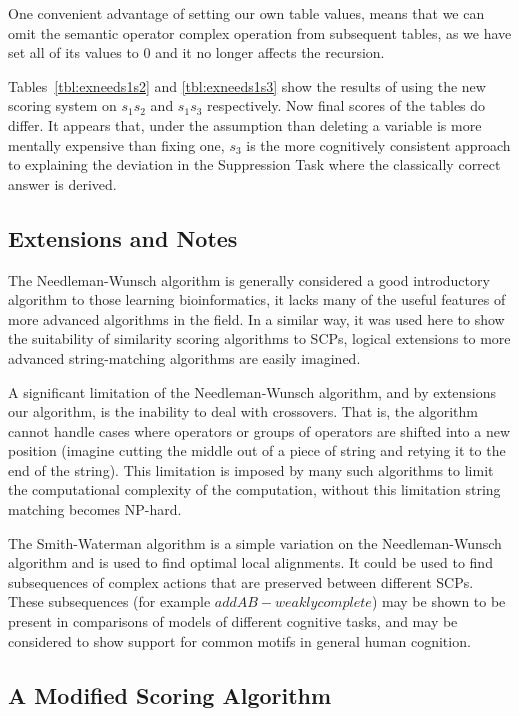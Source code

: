 One convenient advantage of setting our own table values, means that we can omit the semantic operator complex operation from subsequent tables, as we have set all of its values to 0 and it no longer affects the recursion.

Tables~\ref{tbl:exneeds1s2} and \ref{tbl:exneeds1s3} show the results of using the new scoring system on $s_1s_2$ and $s_1s_3$ respectively. Now final scores of the tables do differ. It appears that, under the assumption than deleting a variable is more mentally expensive than fixing one, $s_3$ is the more cognitively consistent approach to explaining the deviation in the Suppression Task where the classically correct answer is derived.

\subsection{Extensions and Notes}

The Needleman-Wunsch algorithm is generally considered a good introductory algorithm to those learning bioinformatics, it lacks many of the useful features of more advanced algorithms in the field. In a similar way, it was used here to show the suitability of similarity scoring algorithms to SCPs, logical extensions to more advanced string-matching algorithms are easily imagined.

A significant limitation of the Needleman-Wunsch algorithm, and by extensions our algorithm, is the inability to deal with crossovers. That is, the algorithm cannot handle cases where operators or groups of operators are shifted into a new position (imagine cutting the middle out of a piece of string and retying it to the end of the string). This limitation is imposed by many such algorithms to limit the computational complexity of the computation, without this limitation string matching becomes NP-hard.

The Smith-Waterman algorithm \citep{smith1981identification} is a simple variation on the Needleman-Wunsch algorithm and is used to  find optimal local alignments. It could be used to find subsequences of complex actions that are preserved between different SCPs. These subsequences (for example $addAB - weaklycomplete$) may be shown to be present in comparisons of models of different cognitive tasks, and may be considered to show support for common motifs in general human cognition.

\subsection{A Modified Scoring Algorithm} \label{ssec:nw_mod}

